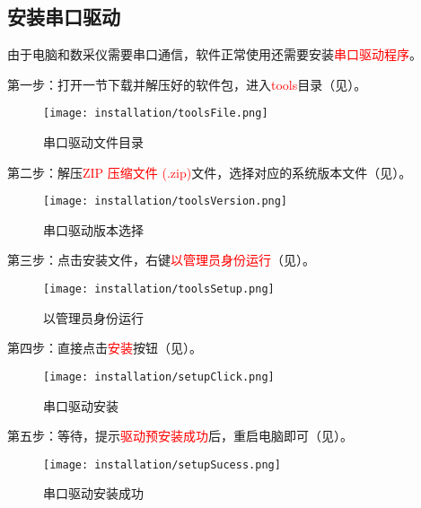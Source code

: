 \subsection{安装串口驱动}
\par 由于电脑和数采仪需要串口通信，软件正常使用还需要安装\textcolor{red}{串口驱动程序}。
\par 第一步：打开一节下载并解压好的软件包，进入\textcolor{red}{tools}目录（见）。
\begin{figure}[H]
    \centering
    \texttt{[image: installation/toolsFile.png]}
    \caption{ 串口驱动文件目录 \label{fig:toolsFile}}
\end{figure}
\par 第二步：解压\textcolor{red}{ZIP 压缩文件 (.zip)}文件，选择对应的系统版本文件（见）。
\begin{figure}[H]
    \centering
    \texttt{[image: installation/toolsVersion.png]}
    \caption{ 串口驱动版本选择 \label{fig:toolsVersion}}
\end{figure}
\par 第三步：点击安装文件，右键\textcolor{red}{以管理员身份运行}（见）。
\begin{figure}[H]
    \centering
    \texttt{[image: installation/toolsSetup.png]}
    \caption{ 以管理员身份运行 \label{fig:toolsSetup}}
\end{figure}
\par 第四步：直接点击\textcolor{red}{安装}按钮（见）。
\begin{figure}[H]
    \centering
    \texttt{[image: installation/setupClick.png]}
    \caption{ 串口驱动安装 \label{fig:setupClick}}
\end{figure}
\par 第五步：等待，提示\textcolor{red}{驱动预安装成功}后，重启电脑即可（见）。
\begin{figure}[H]
    \centering
    \texttt{[image: installation/setupSucess.png]}
    \caption{ 串口驱动安装成功 \label{fig:setupSucess}}
\end{figure}
